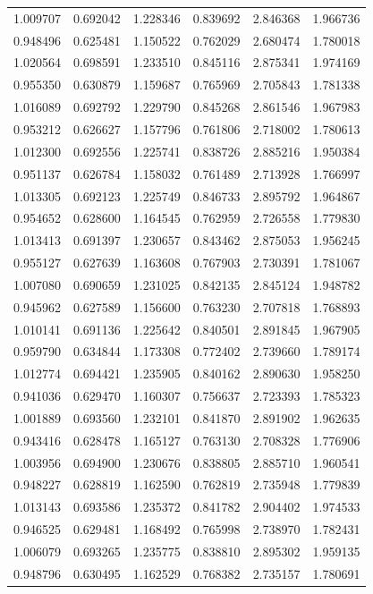\begin{table}[htbp]
\begin{center}
\begin{tabular}{ |c|c|c|c|c|c| }
        1.009707 & 0.692042 & 1.228346 & 0.839692 & 2.846368 & 1.966736 \\
        0.948496 & 0.625481 & 1.150522 & 0.762029 & 2.680474 & 1.780018 \\
        1.020564 & 0.698591 & 1.233510 & 0.845116 & 2.875341 & 1.974169 \\
        0.955350 & 0.630879 & 1.159687 & 0.765969 & 2.705843 & 1.781338 \\
        1.016089 & 0.692792 & 1.229790 & 0.845268 & 2.861546 & 1.967983 \\
        0.953212 & 0.626627 & 1.157796 & 0.761806 & 2.718002 & 1.780613 \\
        1.012300 & 0.692556 & 1.225741 & 0.838726 & 2.885216 & 1.950384 \\
        0.951137 & 0.626784 & 1.158032 & 0.761489 & 2.713928 & 1.766997 \\
        1.013305 & 0.692123 & 1.225749 & 0.846733 & 2.895792 & 1.964867 \\
        0.954652 & 0.628600 & 1.164545 & 0.762959 & 2.726558 & 1.779830 \\
        1.013413 & 0.691397 & 1.230657 & 0.843462 & 2.875053 & 1.956245 \\
        0.955127 & 0.627639 & 1.163608 & 0.767903 & 2.730391 & 1.781067 \\
        1.007080 & 0.690659 & 1.231025 & 0.842135 & 2.845124 & 1.948782 \\
        0.945962 & 0.627589 & 1.156600 & 0.763230 & 2.707818 & 1.768893 \\
        1.010141 & 0.691136 & 1.225642 & 0.840501 & 2.891845 & 1.967905 \\
        0.959790 & 0.634844 & 1.173308 & 0.772402 & 2.739660 & 1.789174 \\
        1.012774 & 0.694421 & 1.235905 & 0.840162 & 2.890630 & 1.958250 \\
        0.941036 & 0.629470 & 1.160307 & 0.756637 & 2.723393 & 1.785323 \\
        1.001889 & 0.693560 & 1.232101 & 0.841870 & 2.891902 & 1.962635 \\
        0.943416 & 0.628478 & 1.165127 & 0.763130 & 2.708328 & 1.776906 \\
        1.003956 & 0.694900 & 1.230676 & 0.838805 & 2.885710 & 1.960541 \\
        0.948227 & 0.628819 & 1.162590 & 0.762819 & 2.735948 & 1.779839 \\
        1.013143 & 0.693586 & 1.235372 & 0.841782 & 2.904402 & 1.974533 \\
        0.946525 & 0.629481 & 1.168492 & 0.765998 & 2.738970 & 1.782431 \\
        1.006079 & 0.693265 & 1.235775 & 0.838810 & 2.895302 & 1.959135 \\
        0.948796 & 0.630495 & 1.162529 & 0.768382 & 2.735157 & 1.780691 \\
        
     \hline
    \end{tabular}
    \end{center}
    \label{amd-ryzen-perf}
\end{table}

